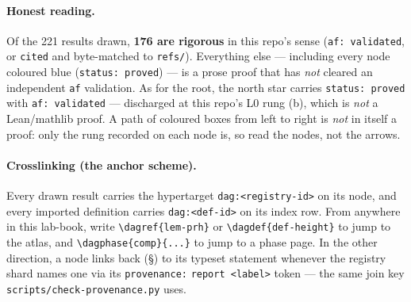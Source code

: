 \paragraph{Honest reading.} Of the 221 results drawn, \textbf{176 are rigorous} in this repo's sense (\texttt{af: validated}, or \texttt{cited} and byte-matched to \texttt{refs/}). Everything else --- including every node coloured blue (\texttt{status: proved}) --- is a prose proof that has \emph{not} cleared an independent \texttt{af} validation. As for the root, the north star  carries \texttt{status: proved} with \texttt{af: validated} --- discharged at this repo's L0 rung (b), which is \emph{not} a Lean/mathlib proof. A path of coloured boxes from left to right is \emph{not} in itself a proof: only the rung recorded on each node is, so read the nodes, not the arrows.

\paragraph{Crosslinking (the anchor scheme).} Every drawn result carries the hypertarget \texttt{dag:\textless registry-id\textgreater} on its node, and every imported definition carries \texttt{dag:\textless def-id\textgreater} on its index row. From anywhere in this lab-book, write \verb|\dagref{lem-prh}| or \verb|\dagdef{def-height}| to jump to the atlas, and \verb|\dagphase{comp}{...}| to jump to a phase page. In the other direction, a node links back (\S) to its typeset statement whenever the registry shard names one via its \texttt{provenance:} \texttt{report \textless label\textgreater} token --- the same join key \texttt{scripts/check-provenance.py} uses.








